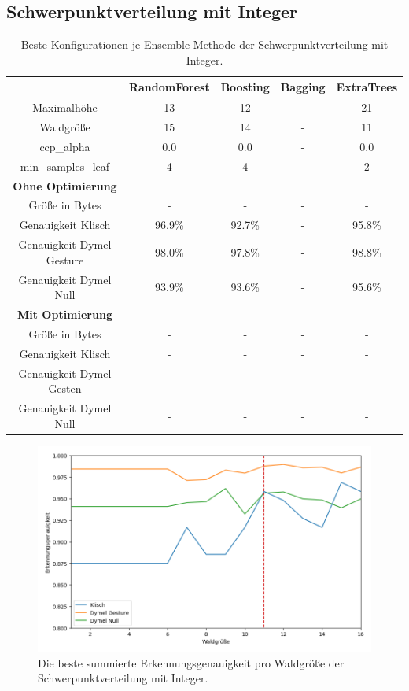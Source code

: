 \subsection{Schwerpunktverteilung mit Integer}
\begin{table}[h!]
    \centering
    \begin{tabular}{ | c | c | c | c | c |}
        \hline
        & RandomForest & Boosting & Bagging & ExtraTrees \\\hline
        Maximalhöhe & 13 & 12 & - & 21 \\\hline
        Waldgröße & 15 & 14 & - & 11 \\\hline
        ccp\_alpha & 0.0 & 0.0 & - & 0.0 \\\hline
        min\_samples\_leaf & 4 & 4 & - & 2 \\\hline
        \textbf{Ohne Optimierung} &  &  &  &  \\\hline
        Größe in Bytes & - & - & - & - \\\hline
        Genauigkeit Klisch & 96.9\% & 92.7\% & - & 95.8\% \\\hline
        Genauigkeit Dymel Gesture & 98.0\% & 97.8\% & - & 98.8\% \\\hline
        Genauigkeit Dymel Null & 93.9\% & 93.6\% & - & 95.6\% \\\hline
        \textbf{Mit Optimierung} &  &  &  &  \\\hline
        Größe in Bytes & - & - & - & - \\\hline
        Genauigkeit Klisch & - & - & - & - \\\hline
        Genauigkeit Dymel Gesten & - & - & - & - \\\hline
        Genauigkeit Dymel Null & - & - & - & - \\\hline
    \end{tabular}
    \caption{Beste Konfigurationen je Ensemble-Methode der Schwerpunktverteilung mit Integer.}
    \label{tab:schwerpunktverteilung_int}
\end{table}
\begin{figure}[h!]
    \centering
    \includegraphics[width=\linewidth]{images/cocd_int_acc_per_size.png}
    \caption{Die beste summierte Erkennungsgenauigkeit pro Waldgröße der Schwerpunktverteilung mit Integer.}
    \label{fig:cocd_int_per_forest_size}
\end{figure}
